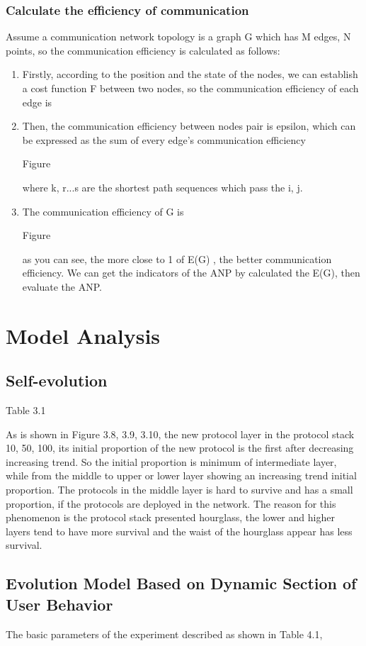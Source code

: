 \documentclass{article}
\begin{document}
\subsubsection{Calculate the efficiency of communication}
Assume a communication network topology is a graph G which has M edges, N points, so the communication efficiency is calculated as follows:
\begin{enumerate}
    \item Firstly,  according to the position and the state of the nodes, we can establish a cost function F between two nodes,  so the communication efficiency of each edge is
    \item Then, the communication efficiency between nodes pair is epsilon, which can be expressed as the sum of every edge's communication efficiency 
    
    Figure
    
    where k, r...s are the shortest path sequences which pass the i, j. 
    \item The communication efficiency of G is
    
    Figure 
    
    as you can see, the more close to 1 of E(G) , the better communication efficiency. We can get the indicators of the ANP by calculated the E(G), then evaluate the ANP. 
    
\end{enumerate}
\section{Model Analysis}
\subsection{Self-evolution}
Table 3.1

As is shown in Figure 3.8, 3.9, 3.10, the new protocol layer in the protocol stack 10, 50, 100, its initial proportion of the new protocol is the first after decreasing increasing trend. So the initial proportion is minimum of intermediate layer, while from the middle to upper or lower layer showing an increasing trend initial proportion. The protocols in the middle layer is hard to survive and has a small proportion, if the protocols are deployed in the network. The reason for this phenomenon is the protocol stack presented hourglass, the lower and higher layers tend to have more survival and the waist of the hourglass appear has less survival. 

\subsection{Evolution Model Based on Dynamic Section of User Behavior}
The basic parameters of the experiment described as shown in Table 4.1,
\end{document}
